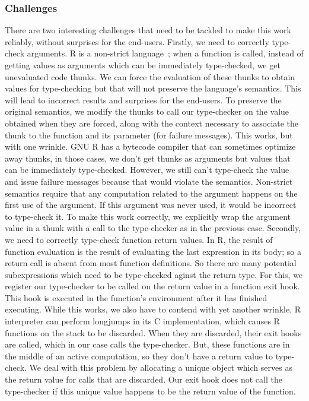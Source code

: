 \documentclass[acmsmall,review,anonymous]{acmart}\settopmatter{printfolios=true,printccs=false,printacmref=false}
\begin{document}
%
%
\subsubsection{Challenges}
There are two interesting challenges that need to be tackled to make this work
reliably, without surprises for the end-users. Firstly, we need to correctly
type-check arguments. R is a non-strict language~\cite{oopsla19};
when a function is called, instead of getting values as arguments which can be
immediately type-checked, we get unevaluated code thunks. We can force the
evaluation of these thunks to obtain values for type-checking but that will not
preserve the language's semantics. This will lead to incorrect results and
surprises for the end-users. To preserve the original semantics, we modify the
thunks to call our type-checker on the value obtained when they are forced,
along with the context necessary to associate the thunk to the function and its
parameter (for failure messages). This works, but with one wrinkle. GNU R has a
bytecode compiler that can sometimes optimize away thunks, in those cases, we
don't get thunks as arguments but values that can be immediately type-checked.
However, we still can't type-check the value and issue failure messages because
that would violate the semantics. Non-strict semantics require that any
computation related to the argument happens on the first use of the argument. If
this argument was never used, it would be incorrect to type-check it. To make
this work correctly, we explicitly wrap the argument value in a thunk with a
call to the type-checker as in the previous case.  Secondly, we need to
correctly type-check function return values. In R, the result of function
evaluation is the result of evaluating the last expression in its body; so a
return call is absent from most function definitions. So there are many
potential subexpressions which need to be type-checked aginst the return type.
For this, we register our type-checker to be called on the return value in a
function exit hook. This hook is executed in the function's environment after it
has finished executing. While this works, we also have to contend with yet
another wrinkle, R interpreter can perform longjumps in its C implementation,
which causes R functions on the stack to be discarded. When they are discarded,
their exit hooks are called, which in our case calls the type-checker. But,
these functions are in the middle of an active computation, so they don't have a
return value to type-check. We deal with this problem by allocating a unique
object which serves as the return value for calls that are discarded. Our exit
hook does not call the type-checker if this unique value happens to be the
return value of the function.
\end{document}
